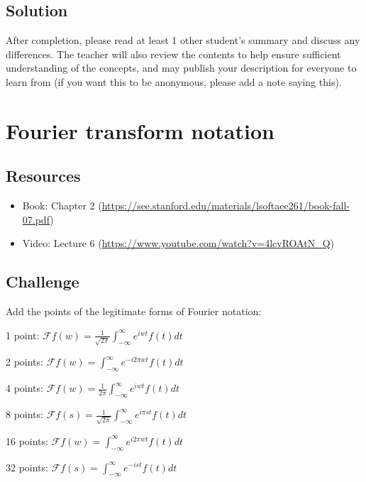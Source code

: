\subsection*{Solution}
After completion, please read at least 1 other student's summary and discuss any differences. The teacher will also review the contents to help ensure sufficient understanding of the concepts, and may publish your description for everyone to learn from (if you want this to be anonymous, please add a note saying this).

\timebox




\newpage
\section{Fourier transform notation}

\subsection*{Resources}
\begin{itemize}
    \item Book: Chapter 2 (\url{https://see.stanford.edu/materials/lsoftaee261/book-fall-07.pdf})
    \item Video: Lecture 6 (\url{https://www.youtube.com/watch?v=4lcvROAtN_Q})
\end{itemize}

\subsection*{Challenge}
Add the points of the legitimate forms of Fourier notation:

1 point: $\displaystyle \mathcal{F}f(w)=\frac{1}{\sqrt{2 \pi}} \int_{-\infty}^{\infty} e^{i w t} f(t) dt$

2 points: $\displaystyle \mathcal{F}f(w)=\int_{-\infty}^{\infty} e^{-i 2 \pi w t} f(t) dt$

4 points: $\displaystyle \mathcal{F}f(w)=\frac{1}{2 \pi} \int_{-\infty}^{\infty} e^{i w t} f(t) dt$

8 points: $\displaystyle \mathcal{F}f(s)=\frac{1}{\sqrt{2 \pi}} \int_{-\infty}^{\infty} e^{i \pi s t} f(t) dt$

16 points: $\displaystyle \mathcal{F}f(w)=\int_{-\infty}^{\infty} e^{i 2 \pi w t} f(t) dt$

32 points: $\displaystyle \mathcal{F}f(s)=\int_{-\infty}^{\infty} e^{-i s t} f(t) dt$


